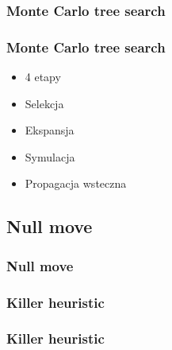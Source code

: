 \documentclass[polish,envcountsect,10pt]{beamer}
\begin{document}
            \subsubsection{Monte Carlo tree search}
                \begin{frame}
                    \frametitle{Monte Carlo tree search}
                    \begin{itemize}
                        \item<1-> 4 etapy
                        \item<2-> Selekcja
                        \item<3-> Ekspansja
                        \item<4-> Symulacja
                        \item<5-> Propagacja wsteczna                         
                    \end{itemize}
                \end{frame}
            \subsection{Null move}
            \begin{frame}
                \frametitle{Null move}
            \end{frame}
            \subsubsection{Killer heuristic}
                \begin{frame}
                    \frametitle{Killer heuristic}
                \end{frame}
            
\end{document}
